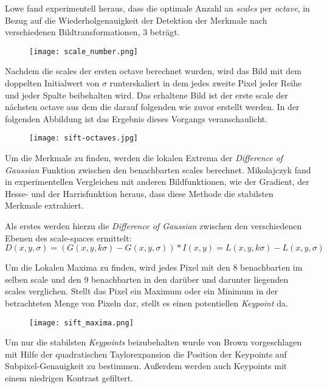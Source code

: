 Lowe fand experimentell heraus, dass die optimale Anzahl an \emph{scales} per \emph{octave}, in Bezug auf die Wiederholgenauigkeit der Detektion der Merkmale nach verschiedenen Bildtransformationen, 3 beträgt.
\begin{figure}[h]
\texttt{[image: scale\_number.png]}
\centering
\end{figure}
Nachdem die \Glspl{scale} der ersten \Gls{octave} berechnet wurden, wird das Bild mit dem doppelten Initialwert von $ \sigma $ runterskaliert in dem jedes zweite Pixel jeder Reihe und jeder Spalte beibehalten wird. Das erhaltene Bild ist der erste \Gls{scale} der nächsten \Gls{octave} aus dem die darauf folgenden wie zuvor erstellt werden.
In der folgenden Abbildung ist das Ergebnis dieses Vorgangs veranschaulicht.

\begin{figure}[h]
\texttt{[image: sift-octaves.jpg]}
\centering
\end{figure}

Um die Merkmale zu finden, werden die lokalen Extrema der \emph{Difference of Gaussian} Funktion zwischen den benachbarten \Glspl{scale} berechnet. Mikolajczyk fand in experimentellen Vergleichen mit anderen Bildfunktionen, wie der Gradient, der Hesse- und der Harrisfunktion heraus, dass diese Methode die stabilsten Merkmale extrahiert.

Als erstes werden hierzu die \emph{Difference of Gaussian} zwischen den verschiedenen Ebenen des \Gls{scale-space}s ermittelt:	
\begin{equation}
D(x, y, \sigma) = (G(x, y, k\sigma) - G(x, y, \sigma)) \ast I(x, y)
= L(x, y, k\sigma) - L(x, y, \sigma)
\end{equation} 

Um die Lokalen Maxima zu finden, wird jedes Pixel mit den 8 benachbarten im selben \Gls{scale} und den 9 benachbarten in den darüber und darunter liegenden \Glspl{scale} verglichen. Stellt das Pixel ein Maximum oder ein Minimum in der betrachteten Menge von Pixeln dar, stellt es einen potentiellen \emph{Keypoint} da.

\begin{figure}[h]
\texttt{[image: sift\_maxima.png]}
\centering
\end{figure}

Um nur die stabilsten \emph{Keypoints} beizubehalten wurde von Brown vorgeschlagen mit Hilfe der quadratischen Taylorexpansion die Position der Keypoints auf Subpixel-Genauigkeit zu bestimmen.
Außerdem werden auch Keypoints mit einem niedrigen Kontrast gefiltert.

